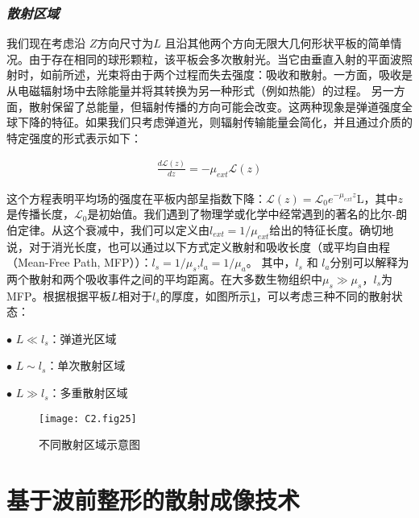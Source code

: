 \subsubsection*{\textbf{\textit{散射区域}}}

我们现在考虑沿 $Z$方向尺寸为$L$ 且沿其他两个方向无限大几何形状平板的简单情况。由于存在相同的球形颗粒，该平板会多次散射光。当它由垂直入射的平面波照射时，如前所述，光束将由于两个过程而失去强度：吸收和散射。一方面，吸收是从电磁辐射场中去除能量并将其转换为另一种形式（例如热能）的过程。 另一方面，散射保留了总能量，但辐射传播的方向可能会改变。这两种现象是弹道强度全球下降的特征。如果我们只考虑弹道光，则辐射传输能量会简化，并且通过介质的特定强度的形式表示如下：

\begin{equation}
\begin{aligned}
    \frac{d\mathcal{L}(z)}{dz} = -\mu_{ext}\mathcal{L}(z)
\end{aligned}
\label{eq:2.03}
\end{equation}

这个方程表明平均场的强度在平板内部呈指数下降：$\mathcal{L}(z) = \mathcal{L}_{0}e^{-\mu_{ext}z}$L，其中$z$是传播长度，$\mathcal{L}_{0}$是初始值。我们遇到了物理学或化学中经常遇到的著名的比尔-朗伯定律。从这个衰减中，我们可以定义由$l_{ext}=1/\mu_{ext}$给出的特征长度。确切地说，对于消光长度，也可以通过以下方式定义散射和吸收长度（或平均自由程（Mean-Free Path, MFP））：$l_{s} = 1/\mu_{s}$,$l_{a} = 1/\mu_{a}$。
其中，$l_{s}$ 和 $l_{a}$分别可以解释为两个散射和两个吸收事件之间的平均距离。在大多数生物组织中$\mu_{s} \gg \mu_{s}$，$l_{s}$为MFP。根据根据平板$L$相对于$l_{s}$的厚度，如图所示\ref{fig2:25}\cite{ntziachristos_going_2010}，可以考虑三种不同的散射状态\cite{ntziachristos_going_2010}：\par
$\bullet$ $ L \ll l_{s} $：弹道光区域\par
$\bullet$ $L \sim l_{s} $：单次散射区域\par
$\bullet$ $L \gg l_{s} $：多重散射区域\par

\begin{figure}[htp]
	\centering
	\texttt{[image: C2.fig25]}
	\caption{不同散射区域示意图}
	\label{fig2:25}
\end{figure}

\section{基于波前整形的散射成像技术}

